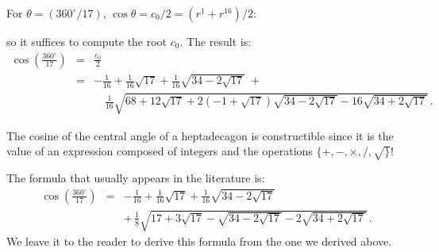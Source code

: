 \documentclass[a4paper,11pt]{article}
\newcommand*{\disfrac}[2]{\displaystyle\frac{#1}{#2}}
\begin{document}
For $\theta=(360^\circ/17)$, $\cos\theta= c_0/2=(r^1+r^{16})/2$:
\begin{center}
\end{center}
so it suffices to compute the root $c_0$. The result is:
\begin{eqnarray*}
\cos\left(\disfrac{360^\circ}{17}\right) &=& 
\disfrac{c_0}{2}\\
&=&-\disfrac{1}{16}+\disfrac{1}{16}\sqrt{17} + 
     \disfrac{1}{16}\sqrt{34-2\sqrt{17}}\; +\\
 &\;\;& \quad\disfrac{1}{16}\sqrt{
     68+12\sqrt{17} + 
     2(-1+\sqrt{17})\sqrt{34-2\sqrt{17}}
   -16
     \sqrt{34+2\sqrt{17}}
   }\,.
\end{eqnarray*}


The cosine of the central angle of a heptadecagon is constructible since it is the value of an expression composed of integers and the operations $\{+,-,\times,/,\surd\}$!

%

The formula that usually appears in the literature is:
\begin{eqnarray*}
\cos\left(\frac{360^\circ}{17}\right)
&=&-\frac{1}{16}+\frac{1}{16}\sqrt{17} + 
     \frac{1}{16}\sqrt{34-2\sqrt{17}}\\
&&+\,\frac{1}{8}\sqrt{
     17+3\sqrt{17} - 
     \sqrt{34-2\sqrt{17}}
   -2
     \sqrt{34+2\sqrt{17}}
   }\,.
\end{eqnarray*}
We leave it to the reader to derive this formula from the one we derived above.
\end{document}
